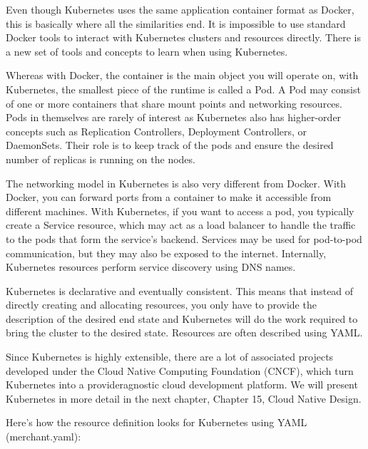 Even though Kubernetes uses the same application container format as Docker, this is basically where all the similarities end. It is impossible to use standard Docker tools to interact with Kubernetes clusters and resources directly. There is a new set of tools and concepts to learn when using Kubernetes.

Whereas with Docker, the container is the main object you will operate on, with Kubernetes, the smallest piece of the runtime is called a Pod. A Pod may consist of one or more containers that share mount points and networking resources. Pods in themselves are rarely of interest as Kubernetes also has higher-order concepts such as Replication Controllers, Deployment Controllers, or DaemonSets. Their role is to keep track of the pods and ensure the desired number of replicas is running on the nodes.

The networking model in Kubernetes is also very different from Docker. With Docker, you can forward ports from a container to make it accessible from different machines. With Kubernetes, if you want to access a pod, you typically create a Service resource, which may act as a load balancer to handle the traffic to the pods that form the service's backend. Services may be used for pod-to-pod communication, but they may also be exposed to the internet. Internally, Kubernetes resources perform service discovery using DNS names.

Kubernetes is declarative and eventually consistent. This means that instead of directly creating and allocating resources, you only have to provide the description of the desired end state and Kubernetes will do the work required to bring the cluster to the desired state. Resources are often described using YAML.

Since Kubernetes is highly extensible, there are a lot of associated projects developed under the Cloud Native Computing Foundation (CNCF), which turn Kubernetes into a provideragnostic cloud development platform. We will present Kubernetes in more detail in the next chapter, Chapter 15, Cloud Native Design.

Here's how the resource definition looks for Kubernetes using YAML (merchant.yaml):


